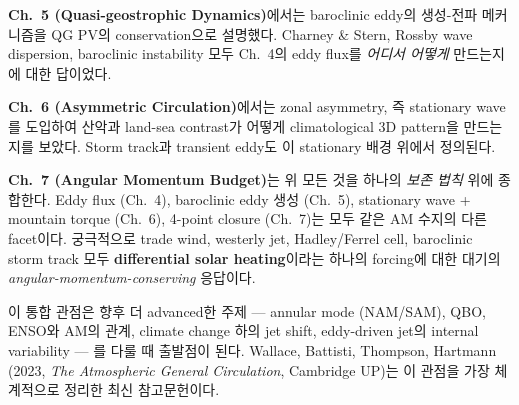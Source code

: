 \begin{hisublock}
\textbf{Ch.~5 (Quasi-geostrophic Dynamics)}에서는 baroclinic eddy의
생성-전파 메커니즘을 QG PV의 conservation으로 설명했다.  Charney \&
Stern, Rossby wave dispersion, baroclinic instability 모두 Ch.~4의
eddy flux를 \emph{어디서 어떻게} 만드는지에 대한 답이었다.

\textbf{Ch.~6 (Asymmetric Circulation)}에서는 zonal asymmetry, 즉
stationary wave를 도입하여 산악과 land-sea contrast가 어떻게 climatological
3D pattern을 만드는지를 보았다.  Storm track과 transient eddy도 이 stationary
배경 위에서 정의된다.

\textbf{Ch.~7 (Angular Momentum Budget)}는 위 모든 것을 하나의 \emph{보존
법칙} 위에 종합한다.  Eddy flux (Ch.~4), baroclinic eddy 생성 (Ch.~5),
stationary wave + mountain torque (Ch.~6), 4-point closure (Ch.~7)는 모두
같은 AM 수지의 다른 facet이다.  궁극적으로 trade wind, westerly jet, Hadley/Ferrel
cell, baroclinic storm track 모두 \textbf{differential solar heating}이라는
하나의 forcing에 대한 대기의 \emph{angular-momentum-conserving} 응답이다.

이 통합 관점은 향후 더 advanced한 주제 --- annular mode (NAM/SAM), QBO,
ENSO와 AM의 관계, climate change 하의 jet shift, eddy-driven jet의 internal
variability --- 를 다룰 때 출발점이 된다.  Wallace, Battisti, Thompson,
Hartmann (2023, \textit{The Atmospheric General Circulation}, Cambridge UP)는
이 관점을 가장 체계적으로 정리한 최신 참고문헌이다.
\end{hisublock}


